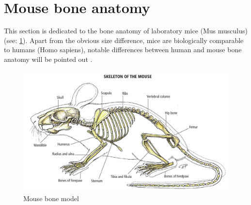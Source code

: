 \section{Mouse bone anatomy}\label{s:b-mouse-anatomy}
This section is dedicated to the bone anatomy of laboratory mice (Mus musculus) (see: \cref{fig:mouseFull}).
Apart from the obvious size difference, mice are biologically comparable to humans (Homo sapiens),
notable differences between human and mouse bone anatomy will be pointed out \cite{ruberteBridgingMouseHuman2023}.
\begin{figure}[h]
	\centerline{
		\includegraphics[scale=0.5]{images/mouseFull.png}}
	\caption{Mouse bone model \cite{ruberteBridgingMouseHuman2023}}\label{fig:mouseFull}
\end{figure}



